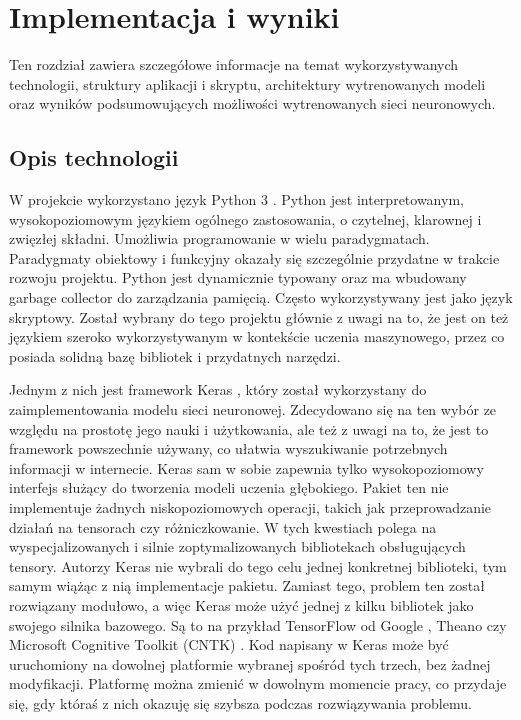 \chapter{Implementacja i wyniki}
\thispagestyle{chapterBeginStyle}
\label{chapter5}


Ten rozdział zawiera szczegółowe informacje na temat wykorzystywanych technologii, struktury aplikacji i skryptu, architektury wytrenowanych modeli oraz wyników podsumowujących możliwości wytrenowanych sieci neuronowych.


\section{Opis technologii}
W projekcie wykorzystano język Python 3 \cite{Python}. Python jest interpretowanym, wysokopoziomowym językiem  ogólnego zastosowania, o czytelnej, klarownej i zwięzłej składni. Umożliwia programowanie w wielu paradygmatach. Paradygmaty obiektowy i funkcyjny okazały się szczególnie przydatne w trakcie rozwoju projektu. Python jest dynamicznie typowany oraz ma wbudowany garbage collector do zarządzania pamięcią. Często wykorzystywany jest jako język skryptowy. Został wybrany do tego projektu głównie z uwagi na to, że jest on też językiem szeroko wykorzystywanym w kontekście uczenia maszynowego, przez co posiada solidną bazę bibliotek i przydatnych narzędzi.

Jednym z nich jest framework Keras \cite{Keras}, który został wykorzystany do zaimplementowania modelu sieci neuronowej. Zdecydowano się na ten wybór ze względu na prostotę jego nauki i użytkowania, ale też z uwagi na to, że jest to framework powszechnie używany, co ułatwia wyszukiwanie potrzebnych informacji w internecie. Keras sam w sobie zapewnia tylko wysokopoziomowy interfejs służący do tworzenia modeli uczenia głębokiego. Pakiet ten nie implementuje żadnych niskopoziomowych operacji, takich jak przeprowadzanie działań na tensorach czy różniczkowanie. W tych kwestiach polega na wyspecjalizowanych i silnie zoptymalizowanych bibliotekach obsługujących tensory. Autorzy Keras nie wybrali do tego celu jednej konkretnej biblioteki, tym samym wiążąc z nią implementacje pakietu. Zamiast tego, problem ten został rozwiązany modułowo, a więc Keras może użyć jednej z kilku bibliotek jako swojego silnika bazowego. Są to na przykład TensorFlow od Google \cite{TensorFlow}, Theano \cite{Theano} czy Microsoft Cognitive Toolkit (CNTK) \cite{CNTK}. Kod napisany w Keras może być uruchomiony na dowolnej platformie wybranej spośród tych trzech, bez żadnej modyfikacji. Platformę można zmienić w dowolnym momencie pracy, co przydaje się, gdy któraś z nich okazuję się szybsza podczas rozwiązywania problemu.

